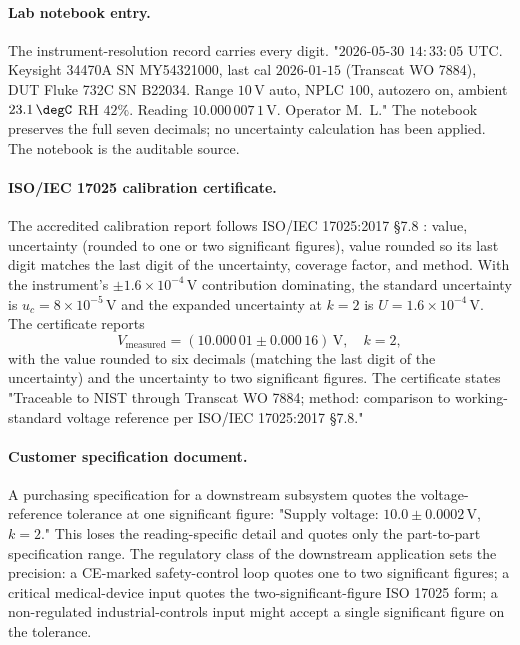 \paragraph{Lab notebook entry.} The instrument-resolution
record carries every digit. "$2026$-$05$-$30$ $14{:}33{:}05$
UTC. Keysight 34470A SN MY54321000, last cal $2026$-$01$-$15$
(Transcat WO 7884), DUT Fluke 732C SN B22034. Range $10\,
\si{\volt}$ auto, NPLC $100$, autozero on, ambient $23.1\,\degC$
RH $42\%$. Reading $10.000\,007\,1\,\si{\volt}$. Operator
M.\ L." The notebook preserves the full seven decimals; no
uncertainty calculation has been applied. The notebook is the
auditable source.

\paragraph{ISO/IEC 17025 calibration certificate.} The
accredited calibration report follows ISO/IEC 17025:2017 \S 7.8
\cite{std:ch04t3b-iso17025-2017}: value, uncertainty (rounded
to one or two significant figures), value rounded so its last
digit matches the last digit of the uncertainty, coverage
factor, and method. With the instrument's $\pm 1.6 \times
10^{-4}\,\si{\volt}$ contribution dominating, the standard
uncertainty is $u_{c} = 8 \times 10^{-5}\,\si{\volt}$ and the
expanded uncertainty at $k = 2$ is $U = 1.6 \times 10^{-4}\,
\si{\volt}$. The certificate reports
\[
V_{\text{measured}} = (10.000\,01 \pm 0.000\,16)\,\si{\volt},\quad
k = 2,
\]
with the value rounded to six decimals (matching the last digit
of the uncertainty) and the uncertainty to two significant
figures. The certificate states "Traceable to NIST through
Transcat WO 7884; method: comparison to working-standard
voltage reference per ISO/IEC 17025:2017 \S 7.8."

\paragraph{Customer specification document.} A purchasing
specification for a downstream subsystem quotes the
voltage-reference tolerance at one significant figure: "Supply
voltage: $10.0 \pm 0.0002\,\si{\volt}$, $k = 2$." This loses
the reading-specific detail and quotes only the part-to-part
specification range. The regulatory class of the downstream
application sets the precision: a CE-marked safety-control
loop quotes one to two significant figures; a critical
medical-device input quotes the two-significant-figure
ISO 17025 form; a non-regulated industrial-controls input
might accept a single significant figure on the tolerance.

